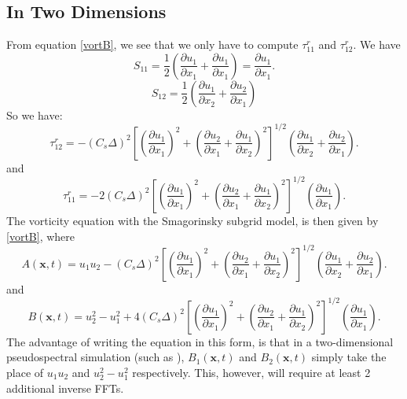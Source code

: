 \documentclass[11pt,a4paper]{article}
\begin{document}
\subsection{In Two Dimensions}
From equation \ref{vortB}, we see that we only have to compute $\tau^r_{11}$ and $\tau^r_{12}$. We have 
$${S}_{11} = \frac{1}{2}\left( \frac{\partial {u}_1}{\partial x_1} + \frac{\partial {u}_1}{\partial x_1}\right) = \frac{\partial {u}_1}{\partial x_1}.$$
$${S}_{12} = \frac{1}{2}\left( \frac{\partial {u}_1}{\partial x_2} + \frac{\partial {u}_2}{\partial x_1}\right)$$
So we have:
\begin{equation}\label{tau12}
\tau_{12}^r= -(C_s \Delta)^2\left[\left( \frac{\partial {u}_1}{\partial x_1}\right)^2+\left( \frac{\partial {u}_2}{\partial x_1} + \frac{\partial {u}_1}{\partial x_2}\right)^2 \right]^{1/2}\left( \frac{\partial {u}_1}{\partial x_2} + \frac{\partial {u}_2}{\partial x_1}\right).
\end{equation}
and
\begin{equation}\label{tau11}
\tau_{11}^r= -2(C_s \Delta)^2\left[\left( \frac{\partial {u}_1}{\partial x_1}\right)^2+\left( \frac{\partial {u}_2}{\partial x_1} + \frac{\partial {u}_1}{\partial x_2}\right)^2 \right]^{1/2}\left(\frac{\partial {u}_1}{\partial x_1}\right).
\end{equation}
The vorticity equation with the Smagorinsky subgrid model, is then given by \ref{vortB}, where
$$A(\boldsymbol{x}, t) = u_1u_2 -(C_s \Delta)^2\left[\left( \frac{\partial {u}_1}{\partial x_1}\right)^2+\left( \frac{\partial {u}_2}{\partial x_1} + \frac{\partial {u}_1}{\partial x_2}\right)^2 \right]^{1/2}\left( \frac{\partial {u}_1}{\partial x_2} + \frac{\partial {u}_2}{\partial x_1}\right).$$
and 
$$B(\boldsymbol{x}, t) = u_2^2 - u_1^2 + 4(C_s \Delta)^2\left[\left( \frac{\partial {u}_1}{\partial x_1}\right)^2+\left( \frac{\partial {u}_2}{\partial x_1} + \frac{\partial {u}_1}{\partial x_2}\right)^2 \right]^{1/2}\left(\frac{\partial {u}_1}{\partial x_1}\right).$$
The advantage of writing the equation in this form, is that in a two-dimensional pseudospectral simulation (such as ), $B_1(\boldsymbol{x},t)$ and $B_2(\boldsymbol{x},t)$ simply take the place of $u_1u_2$ and $u_2^2 - u_1^2$ respectively. This, however, will require at least 2 additional inverse FFTs.
\newpage\hfill \\

\clearpage

\end{document}
